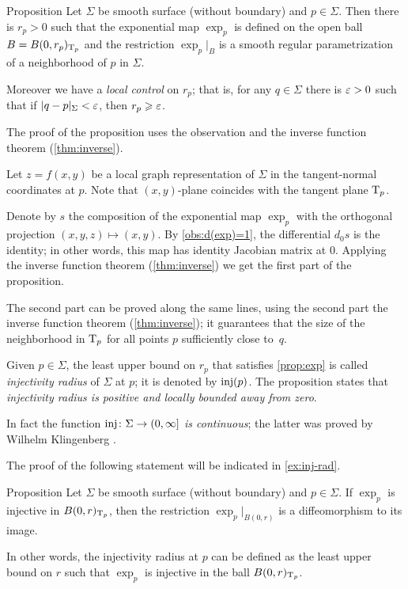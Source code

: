 \begin{thm}{Proposition}\label{prop:exp}
Let $\Sigma$ be smooth surface (without boundary) and $p\in \Sigma$.
Then there is $r_p>0$ such that
the exponential map $\exp_p$ is defined on the open ball $B=B(0,r_p)_{\mathrm{T}_p}$
and the restriction $\exp_p|_B$ is a smooth regular parametrization of a neighborhood of $p$ in $\Sigma$.

Moreover we have a {}\emph{local control} on $r_p$;
that is, for any $q\in \Sigma$ there is $\varepsilon>0$ such that if $|q-p|_\Sigma<\varepsilon$, then $r_p\geqslant\varepsilon$.
\end{thm}

The proof of the proposition uses the observation and the inverse function theorem (\ref{thm:inverse}).

Let $z=f(x,y)$ be a local graph representation of $\Sigma$ in the tangent-normal coordinates at $p$.
Note that $(x,y)$-plane coincides with the tangent plane $\mathrm{T}_p$.

Denote by $s$ the composition of  the exponential map $\exp_p$ with the orthogonal projection $(x,y,z)\mapsto (x,y)$.
By \ref{obs:d(exp)=1}, the differential $d_0s$ is the identity;
in other words, this map has identity Jacobian matrix at $0$.
Applying the inverse function theorem (\ref{thm:inverse}) we get the first part of the proposition.

The second part can be proved along the same lines, using the second part the inverse function theorem (\ref{thm:inverse});
it guarantees that the size of the neighborhood in $\mathrm{T}_p$ for all points $p$ sufficiently close to~$q$.
\qeds

Given $p\in \Sigma$, the least upper bound on $r_p$ that satisfies \ref{prop:exp} is called \emph{injectivity radius} of $\Sigma$ at $p$;
it is denoted by $\mathop{\rm inj}\nolimits(p)$.
The proposition states that {}\emph{injectivity radius is positive and locally bounded away from zero}.

In fact the function {}\emph{$\mathop{\rm inj}\nolimits\colon\Sigma\to (0,\infty]$ is continuous};
the latter was proved by Wilhelm Klingenberg \cite[5.4]{gromoll-klingenberg-meyer}. 

The proof of the following statement will be indicated in \ref{ex:inj-rad}.

\begin{thm}{Proposition}\label{prop:inj-rad}
Let $\Sigma$ be smooth surface (without boundary) and $p\in \Sigma$.
If $\exp_p$ is injective in $B(0,r)_{\mathrm{T}_p}$, then the restriction $\exp_p|_{B(0,r)}$ is a diffeomorphism to its image.

In other words, the injectivity radius at $p$ can be defined as the least upper bound on $r$ such that $\exp_p$ is injective in the ball $B(0,r)_{\mathrm{T}_p}$.
\end{thm}

